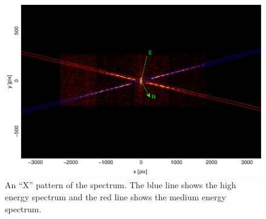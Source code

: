 \begin{figure}[ht!]
    \centering
    \includegraphics[width = \linewidth]{Chapters/Figures/sky_field.png}
    \caption{An ``X'' pattern of the spectrum. The blue line shows the high energy spectrum and the red line shows the medium energy spectrum.}
    \label{skyfield}
\end{figure}

